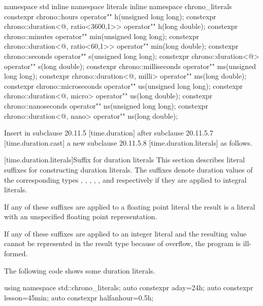 \documentclass[ebook,11pt,article]{memoir}
\begin{document}
\begin{codeblock}
namespace std {
inline namespace literals {
inline namespace chrono_literals{
constexpr 
chrono::hours operator"" h(unsigned long long);
constexpr 
chrono::duration<@\unspec@, ratio<3600,1>> operator"" h(long double);
constexpr 
chrono::minutes operator"" min(unsigned long long);
constexpr 
chrono::duration<@\unspec@, ratio<60,1>> operator"" min(long double);
constexpr 
chrono::seconds operator"" s(unsigned long long);
constexpr 
chrono::duration<@\unspec@> operator"" s(long double);
constexpr 
chrono::milliseconds operator"" ms(unsigned long long);
constexpr 
chrono::duration<@\unspec@, milli> operator"" ms(long double);
constexpr 
chrono::microseconds operator"" us(unsigned long long);
constexpr 
chrono::duration<@\unspec@, micro> operator"" us(long double);
constexpr 
chrono::nanoseconds operator"" ns(unsigned long long);
constexpr 
chrono::duration<@\unspec@, nano> operator"" ns(long double);
}}}
\end{codeblock}

Insert in subclause 20.11.5 [time.duration] after subclause 20.11.5.7 [time.duration.cast] a new subclause 20.11.5.8 [time.duration.literals] as follows.

[time.duration.literals]{Suffix for duration literals}
\pnum
This section describes literal suffixes for constructing duration literals. The suffixes  denote duration values of the corresponding types , , , , , and  respectively if they are applied to integral literals. 

\pnum
If any of these suffixes are applied to a floating point literal the result is a  literal with an unspecified floating point representation.

\pnum
If any of these suffixes are applied to an integer literal and the resulting  value cannot be represented in the result type because of overflow, the program is ill-formed.

\pnum
\enterexample 
The following code shows some duration literals.
\begin{codeblock}
using namespace std::chrono_literals;
auto constexpr aday=24h; 
auto constexpr lesson=45min; 
auto constexpr halfanhour=0.5h;
\end{codeblock}
\exitexample

\pnum
\end{document}
